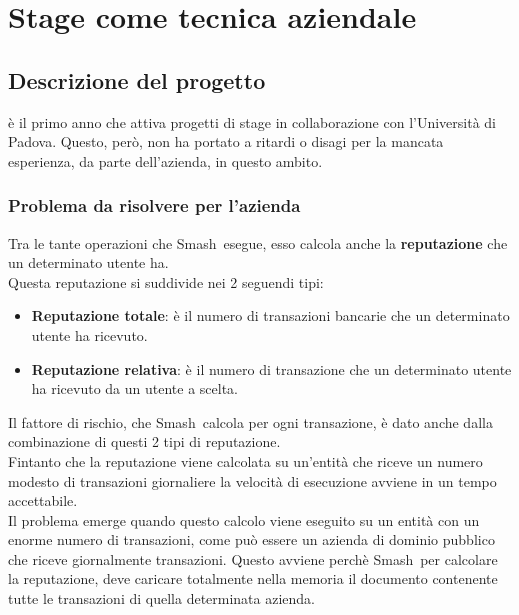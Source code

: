 
\chapter{Stage come tecnica aziendale}
\label{cap:tecnica-stage}

\section{Descrizione del progetto}
\textit{\azienda} è il primo anno che attiva progetti di stage in collaborazione con l'Università di Padova. Questo, però, non ha portato a ritardi o disagi per la mancata esperienza, da parte dell'azienda, in questo ambito. 
\subsection{Problema da risolvere per l'azienda}
Tra le tante operazioni che Smash\textregistered\ esegue, esso calcola anche la \textbf{reputazione} che un determinato utente ha.\\
Questa reputazione si suddivide nei 2 seguendi tipi:
\begin{itemize}
\item{\textbf{Reputazione totale}:} è il numero di transazioni bancarie che un determinato utente ha ricevuto.
\item{\textbf{Reputazione relativa}:} è il numero di transazione che un determinato utente ha ricevuto da un utente a scelta.
\end{itemize}
Il fattore di rischio, che Smash\textregistered\ calcola per ogni transazione, è dato anche dalla combinazione di questi 2 tipi di reputazione.\\
Fintanto che la reputazione viene calcolata su un'entità che riceve un numero modesto di transazioni giornaliere la velocità di esecuzione avviene in un tempo accettabile. 
\\Il problema emerge quando questo calcolo viene eseguito su un entità con un enorme numero di transazioni, come può essere un azienda di dominio pubblico che riceve giornalmente transazioni. Questo avviene perchè Smash\textregistered\, per calcolare la reputazione, deve caricare totalmente nella memoria il documento contenente tutte le transazioni di quella determinata azienda.
